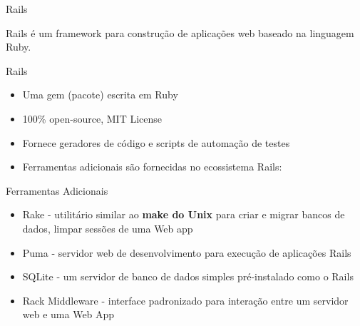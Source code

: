 \begin{frame}{Rails}
	\begin{center}
		\large Rails é um \alert{framework} para construção de \alert{aplicações web} baseado na \alert{linguagem Ruby}.
	\end{center}
\end{frame}
\begin{frame}[fragile, t]{Rails}
	\begin{itemize}
		\item Uma \alert{gem} (pacote) escrita em Ruby
		\item 100\% \alert{open-source}, MIT License
		\item Fornece \alert{geradores} de código e scripts de \alert{automação} de testes
		\item Ferramentas adicionais são fornecidas no ecossistema Rails:
	\end{itemize}
\end{frame}

\begin{frame}[fragile, t]{Ferramentas Adicionais}
	\begin{itemize}
		\item \alert{Rake} - utilitário similar ao \textbf{make do Unix} para criar e migrar bancos de dados, limpar sessões de uma Web app
		\item \alert{Puma} - servidor web de desenvolvimento para execução de aplicações Rails
		\item \alert{SQLite} - um servidor de banco de dados simples pré-instalado como o Rails
		\item \alert{Rack Middleware} - interface padronizado para interação entre um servidor web e uma Web App
	\end{itemize}
\end{frame}